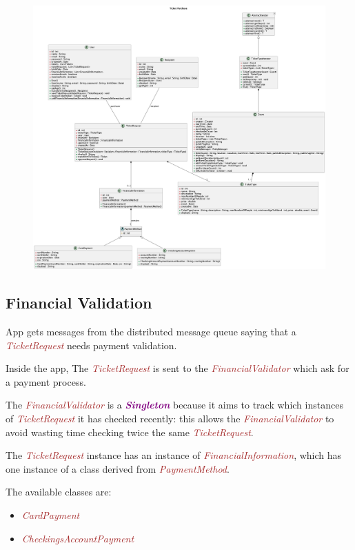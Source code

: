 \documentclass{article}
\newcommand{\designpattern}[1]{\textbf{\textit{\textcolor{purple}{#1}}}}
\newcommand{\designclass}[1]{\textit{\textcolor{brown}{#1}}}
\begin{document}
\begin{figure}[h]
    \centering
    \includegraphics[width=\textwidth, keepaspectratio]{assets/uml/relations/TicketPurchase.png}
\end{figure}

\FloatBarrier
\subsection{Financial Validation}
App gets messages from the distributed message queue saying that a \designclass{TicketRequest} needs payment validation.

Inside the app, The \designclass{TicketRequest} is sent to the \designclass{FinancialValidator} which ask for a payment process.

The \designclass{FinancialValidator} is a \designpattern{Singleton} because it aims to track which instances of \designclass{TicketRequest} it has checked recently: this allows the \designclass{FinancialValidator} to avoid wasting time checking twice the same \designclass{TicketRequest}.

The \designclass{TicketRequest} instance has an instance of \designclass{FinancialInformation}, which has one instance of a class derived from \designclass{PaymentMethod}.

The available classes are:
\begin{itemize}
    \item \designclass{CardPayment}
    \item \designclass{CheckingsAccountPayment}
\end{itemize}
\end{document}
